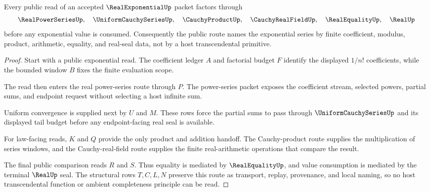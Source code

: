 \begin{theorem}\label{thm:real-exponential-series-route}
Every public read of an accepted $\RealExponentialUp$ packet factors through
$$
\RealPowerSeriesUp,\quad
\UniformCauchySeriesUp,\quad
\CauchyProductUp,\quad
\CauchyRealFieldUp,\quad
\RealEqualityUp,\quad
\RealUp
$$
before any exponential value is consumed. Consequently the public route names the exponential series by finite coefficient, modulus, product, arithmetic, equality, and real-seal data, not by a host transcendental primitive.
\end{theorem}
\begin{proof}
Start with a public exponential read. The coefficient ledger $A$ and factorial budget $F$ identify the displayed $1/n!$ coefficients, while the bounded window $B$ fixes the finite evaluation scope.

The read then enters the real power-series route through $P$. The power-series packet exposes the coefficient stream, selected powers, partial sums, and endpoint request without selecting a host infinite sum.

Uniform convergence is supplied next by $U$ and $M$. These rows force the partial sums to pass through $\UniformCauchySeriesUp$ and its displayed tail budget before any endpoint-facing real seal is available.

For law-facing reads, $K$ and $Q$ provide the only product and addition handoff. The Cauchy-product route supplies the multiplication of series windows, and the Cauchy-real-field route supplies the finite real-arithmetic operations that compare the result.

The final public comparison reads $R$ and $S$. Thus equality is mediated by $\RealEqualityUp$, and value consumption is mediated by the terminal $\RealUp$ seal. The structural rows $T,C,L,N$ preserve this route as transport, replay, provenance, and local naming, so no host transcendental function or ambient completeness principle can be read.
\end{proof}


